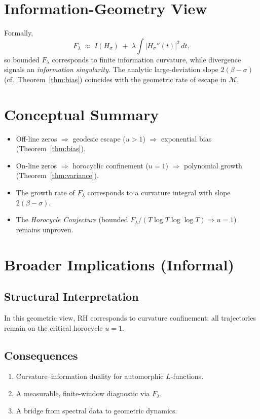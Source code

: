 \section{Information-Geometry View}\label{sec:geom-preview}

Formally,
\[
F_\lambda \;\approx\; I(H_\sigma)
  \;+\; \lambda\!\int |H_\sigma''(t)|^2\,dt,
\]
so bounded $F_\lambda$ corresponds to finite information curvature,
while divergence signals an \emph{information singularity}.
The analytic large-deviation slope $2(\beta-\sigma)$
(cf.~Theorem~\ref{thm:bias}) coincides with the geometric rate of escape
in $\mathcal{M}$.

\section{Conceptual Summary}

\begin{itemize}
  \item Off-line zeros $\Rightarrow$ geodesic escape ($u>1$) $\Rightarrow$ exponential bias (Theorem~\ref{thm:bias}).  
  \item On-line zeros $\Rightarrow$ horocyclic confinement ($u=1$) $\Rightarrow$ polynomial growth (Theorem~\ref{thm:variance}).  
  \item The growth rate of $F_\lambda$ corresponds to a curvature integral with slope $2(\beta-\sigma)$.  
  \item The \emph{Horocycle Conjecture}
        (bounded $F_\lambda/(T\log T\log\log T)\Rightarrow u=1$) remains unproven.  
\end{itemize}

\section{Broader Implications (Informal)}

\subsection{Structural Interpretation}
In this geometric view, RH corresponds to curvature confinement:
all trajectories remain on the critical horocycle $u=1$.

\subsection{Consequences}
\begin{enumerate}
  \item Curvature–information duality for automorphic $L$-functions.
  \item A measurable, finite-window diagnostic via $F_\lambda$.
  \item A bridge from spectral data to geometric dynamics.
\end{enumerate}

